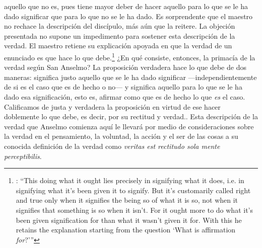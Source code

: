 aquello que no es, pues tiene mayor deber de hacer aquello para lo que se le ha dado significar que para lo que no se le ha dado. Es sorprendente que el maestro no rechace la descripción del discípulo, más aún que la reitere. La objeción presentada no supone un impedimento para sostener esta descripción de la verdad. El maestro retiene su explicación apoyada en que la verdad de un enunciado es que hace lo que debe.\footnote{\cite[Cf.~][76]{anscombe2011plato:truth}: \enquote{This doing what it ought lies precisely in signifying what it does, i.e. in signifying what it's been given it to signify. But it's customarily called right and true only when it signifies the being so of what it is so, not when it signifies that something is so when it isn't. For it ought more to do what it's been given signification for than what it wasn't given it for. With this he retains the explanation starting from the question `What is affirmation \emph{for}?'}} ¿En qué consiste, entonces, la primacía de la verdad según San Anselmo? La proposición verdadera hace lo que debe de dos maneras: significa justo aquello que se le ha dado significar ---independientemente de si es el caso que es de hecho o no--- y significa aquello para lo que se le ha dado esa significación, esto es, afirmar como que es de hecho lo que \emph{es} el caso. Calificamos de justa y verdadera la proposición en virtud de ese hacer doblemente lo que debe, es decir, por su rectitud y verdad.\autocite[Cf.~][497]{anselm1952obras:deveritate}. Esta descripción de la verdad que Anselmo comienza aquí le llevará por medio de consideraciones sobre la verdad en el pensamiento, la voluntad, la acción y el ser de las cosas a su conocida definición de la verdad como \emph{veritas est rectitudo sola mente perceptibilis}\autocite[522]{anselm1952obras:deveritate}.

